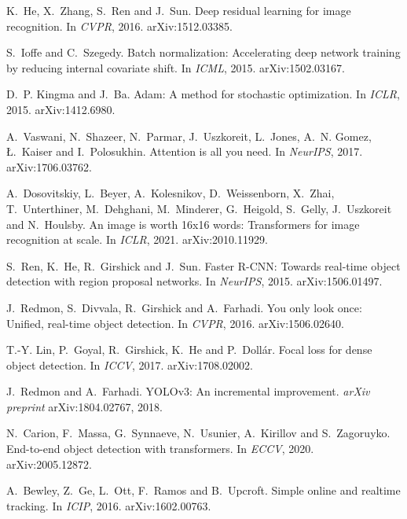 K.~He, X.~Zhang, S.~Ren and J.~Sun.
Deep residual learning for image recognition.
In \textit{CVPR}, 2016. arXiv:1512.03385.

S.~Ioffe and C.~Szegedy.
Batch normalization: Accelerating deep network training by reducing internal covariate shift.
In \textit{ICML}, 2015. arXiv:1502.03167.

D.~P. Kingma and J.~Ba.
Adam: A method for stochastic optimization.
In \textit{ICLR}, 2015. arXiv:1412.6980.

A.~Vaswani, N.~Shazeer, N.~Parmar, J.~Uszkoreit, L.~Jones, A.~N. Gomez, {\L}.~Kaiser and I.~Polosukhin.
Attention is all you need.
In \textit{NeurIPS}, 2017. arXiv:1706.03762.

A.~Dosovitskiy, L.~Beyer, A.~Kolesnikov, D.~Weissenborn, X.~Zhai, T.~Unterthiner, M.~Dehghani, M.~Minderer, G.~Heigold, S.~Gelly, J.~Uszkoreit and N.~Houlsby.
An image is worth 16x16 words: Transformers for image recognition at scale.
In \textit{ICLR}, 2021. arXiv:2010.11929.

S.~Ren, K.~He, R.~Girshick and J.~Sun.
Faster R-CNN: Towards real-time object detection with region proposal networks.
In \textit{NeurIPS}, 2015. arXiv:1506.01497.

J.~Redmon, S.~Divvala, R.~Girshick and A.~Farhadi.
You only look once: Unified, real-time object detection.
In \textit{CVPR}, 2016. arXiv:1506.02640.

T.-Y. Lin, P.~Goyal, R.~Girshick, K.~He and P.~Doll\'ar.
Focal loss for dense object detection.
In \textit{ICCV}, 2017. arXiv:1708.02002.

J.~Redmon and A.~Farhadi.
YOLOv3: An incremental improvement.
\textit{arXiv preprint} arXiv:1804.02767, 2018.

N.~Carion, F.~Massa, G.~Synnaeve, N.~Usunier, A.~Kirillov and S.~Zagoruyko.
End-to-end object detection with transformers.
In \textit{ECCV}, 2020. arXiv:2005.12872.

A.~Bewley, Z.~Ge, L.~Ott, F.~Ramos and B.~Upcroft.
Simple online and realtime tracking.
In \textit{ICIP}, 2016. arXiv:1602.00763.
